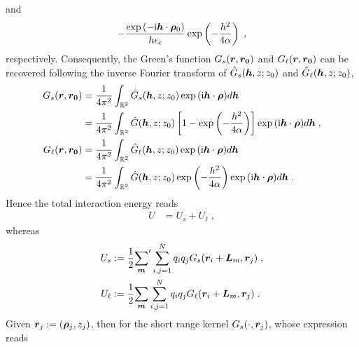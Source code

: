 and 
\begin{equation*}
    -\frac{\exp{(-\mathrm{i} \boldsymbol{h} \cdot \boldsymbol{\rho}_0)}}{h\epsilon_{\mathrm{c}}}\exp\left(-\frac{h^2}{4\alpha}\right)\;,
\end{equation*} 
respectively.
Consequently, the Green's function $ G_s(\boldsymbol{r}, \boldsymbol{r_0})$ and $  G_\ell(\boldsymbol{r}, \boldsymbol{r_0})$ can be recovered following the inverse Fourier transform of $  \hat{G}_s(\boldsymbol{h}, z; z_0)$ and $  \hat{G}_\ell(\boldsymbol{h}, z; z_0)$,
\begin{equation*}
\begin{aligned}
 G_s(\boldsymbol{r}, \boldsymbol{r_0})&=   \frac{1}{4\pi^2}\int_{\mathbb{R}^2} \hat{G}_s(\boldsymbol{h}, z; z_0)\exp{(\mathrm{i} \boldsymbol{h} \cdot \boldsymbol{\rho})} d \boldsymbol{h}\\
 &= \frac{1}{4\pi^2}\int_{\mathbb{R}^2} \hat{G}(\boldsymbol{h}, z; z_0)\left[1-\exp\left(-\frac{h^2}{4\alpha}\right)\right]\exp{(\mathrm{i} \boldsymbol{h} \cdot \boldsymbol{\rho})} d \boldsymbol{h}\;,\\
  G_\ell(\boldsymbol{r}, \boldsymbol{r_0})&=   \frac{1}{4\pi^2}\int_{\mathbb{R}^2} \hat{G}_\ell(\boldsymbol{h}, z; z_0)\exp{(\mathrm{i} \boldsymbol{h} \cdot \boldsymbol{\rho})} d \boldsymbol{h}\\
 &= \frac{1}{4\pi^2}\int_{\mathbb{R}^2} \hat{G}(\boldsymbol{h}, z; z_0)\exp\left(-\frac{h^2}{4\alpha}\right)\exp{(\mathrm{i} \boldsymbol{h} \cdot \boldsymbol{\rho})} d \boldsymbol{h}\;.
\end{aligned}    
\end{equation*}
Hence the total interaction energy reads
\begin{align*}
   U & =   U_s+U_\ell\;,
\end{align*}
whereas
\begin{align}
U_s&:=    \frac{1}{2} {\sum_{\boldsymbol{m}}}^\prime \sum_{i, j = 1}^{N} q_i q_j G_s(\boldsymbol{r}_i+\bm{L}_m, \boldsymbol{r}_j)\;, \label{eq::U_s}\\
U_\ell&:=   \frac{1}{2} {\sum_{\boldsymbol{m}}}\sum_{i, j = 1}^{N} q_i q_j  G_\ell(\boldsymbol{r}_i+\bm{L}_m, \boldsymbol{r}_j)\;. \label{eq::U_l}
\end{align}
Given $\bm{r}_j:=(\bm{\rho}_j, z_j)$, then for the short range kernel $G_s(\cdot, \boldsymbol{r}_j)$, whose expression reads 
